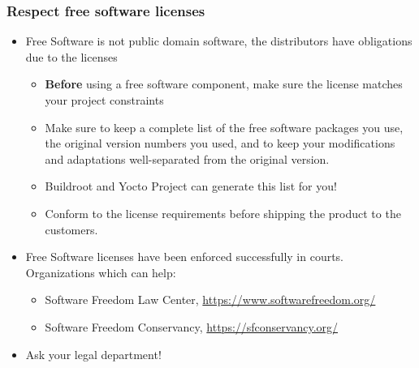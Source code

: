 \begin{frame}
  \frametitle{Respect free software licenses}
  \begin{itemize}
  \item Free Software is not public domain software, the distributors
    have obligations due to the licenses
    \begin{itemize}
    \item {\bf Before} using a free software component, make sure the
      license matches your project constraints
    \item Make sure to keep a complete list of the free software
      packages you use, the original version numbers you used, and to
      keep your modifications and adaptations well-separated from
      the original version.
    \item Buildroot and Yocto Project can generate this list for you!
    \item Conform to the license requirements before shipping the
      product to the customers.
    \end{itemize}
  \item Free Software licenses have been enforced successfully in
    courts. Organizations which can help:
    \begin{itemize}
    \item Software Freedom Law Center, \url{https://www.softwarefreedom.org/}
    \item Software Freedom Conservancy, \url{https://sfconservancy.org/}
    \end{itemize}
  \item Ask your legal department!
  \end{itemize}
\end{frame}

